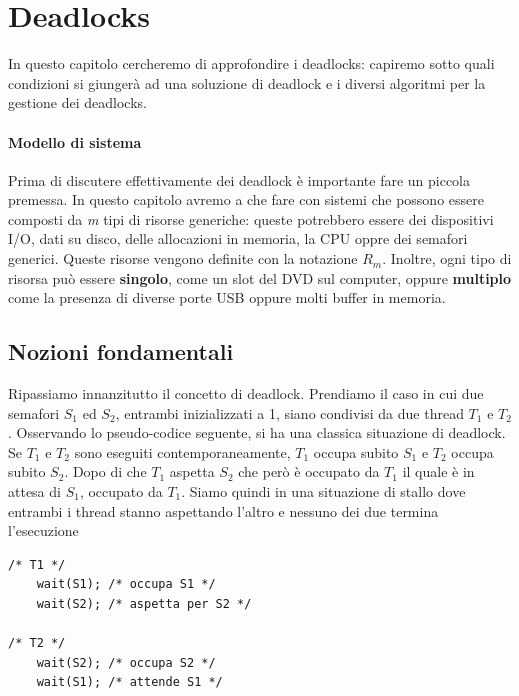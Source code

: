 \pagebreak
\chapter{Deadlocks} \label{deadlocks}
In questo capitolo cercheremo di approfondire i deadlocks: capiremo sotto quali condizioni si giungerà ad una soluzione di deadlock e i diversi algoritmi per la gestione dei deadlocks.

\subsubsection*{Modello di sistema}
Prima di discutere effettivamente dei deadlock è importante fare un piccola premessa. In questo capitolo avremo a che fare con sistemi che possono essere composti da \textit{m} tipi di risorse generiche: queste potrebbero essere dei dispositivi I/O, dati su disco, delle allocazioni in memoria, la CPU oppre dei semafori generici. Queste risorse vengono definite con la notazione $R_m$. Inoltre, ogni tipo di risorsa può essere \textbf{singolo}, come un slot del DVD sul computer, oppure \textbf{multiplo} come la presenza di diverse porte USB oppure molti buffer in memoria.
% 
\section{Nozioni fondamentali}
Ripassiamo innanzitutto il concetto di deadlock. Prendiamo il caso in cui due semafori $S_1$ ed $S_2$, entrambi inizializzati a 1, siano condivisi da due thread $T_1$ e $T_2$. Osservando lo pseudo-codice seguente, si ha una classica situazione di deadlock. Se $T_1$ e $T_2$ sono eseguiti contemporaneamente, $T_1$ occupa subito $S_1$ e $T_2$ occupa subito $S_2$. Dopo di che $T_1$ aspetta $S_2$ che però è occupato da $T_1$ il quale è in attesa di $S_1$, occupato da $T_1$. Siamo quindi in una situazione di stallo dove entrambi i thread stanno aspettando l'altro e nessuno dei due termina l'esecuzione

\begin{lstlisting}[caption = {Classica situazione di deadlock}]
/* T1 */
    wait(S1); /* occupa S1 */
    wait(S2); /* aspetta per S2 */

/* T2 */
    wait(S2); /* occupa S2 */
    wait(S1); /* attende S1 */
\end{lstlisting}
% 

% 
